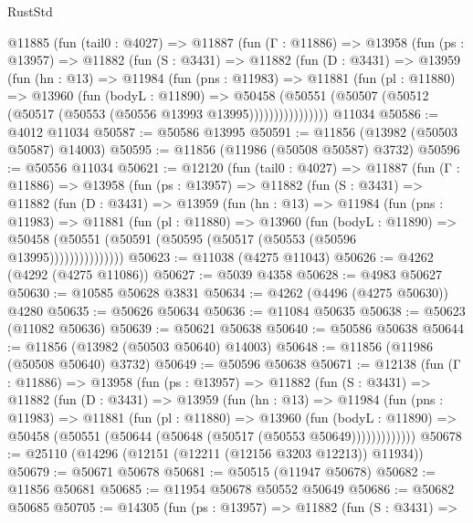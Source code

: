 \begin{lexlean}{RustStd}
\begin{coremodule}
    @11885
      (fun (tail0 : @4027) =>
      @11887
        (fun (Γ : @11886) =>
        @13958
          (fun (ps : @13957) =>
          @11882
            (fun (S : @3431) =>
            @11882
              (fun (D : @3431) =>
              @13959
                (fun (hn : @13) =>
                @11984
                  (fun (pns : @11983) =>
                  @11881
                    (fun (pl : @11880) =>
                    @13960
                      (fun (bodyL : @11890) =>
                      @50458
                        (@50551
                          (@50507 (@50512 (@50517 (@50553 (@50556 @13993 @13995))))))))))))))))
    @11034
@50586 := @4012 @11034
@50587 := @50586 @13995
@50591 := @11856 (@13982 (@50503 @50587) @14003)
@50595 := @11856 (@11986 (@50508 @50587) @3732)
@50596 := @50556 @11034
@50621 := @12120
    (fun (tail0 : @4027) =>
    @11887
      (fun (Γ : @11886) =>
      @13958
        (fun (ps : @13957) =>
        @11882
          (fun (S : @3431) =>
          @11882
            (fun (D : @3431) =>
            @13959
              (fun (hn : @13) =>
              @11984
                (fun (pns : @11983) =>
                @11881
                  (fun (pl : @11880) =>
                  @13960
                    (fun (bodyL : @11890) =>
                    @50458 (@50551 (@50591 (@50595 (@50517 (@50553 (@50596 @13995)))))))))))))))
@50623 := @11038 (@4275 @11043)
@50626 := @4262 (@4292 (@4275 @11086))
@50627 := @5039 @4358
@50628 := @4983 @50627
@50630 := @10585 @50628 @3831
@50634 := @4262 (@4496 (@4275 @50630)) @4280
@50635 := @50626 @50634
@50636 := @11084 @50635
@50638 := @50623 (@11082 @50636)
@50639 := @50621 @50638
@50640 := @50586 @50638
@50644 := @11856 (@13982 (@50503 @50640) @14003)
@50648 := @11856 (@11986 (@50508 @50640) @3732)
@50649 := @50596 @50638
@50671 := @12138
    (fun (Γ : @11886) =>
    @13958
      (fun (ps : @13957) =>
      @11882
        (fun (S : @3431) =>
        @11882
          (fun (D : @3431) =>
          @13959
            (fun (hn : @13) =>
            @11984
              (fun (pns : @11983) =>
              @11881
                (fun (pl : @11880) =>
                @13960
                  (fun (bodyL : @11890) =>
                  @50458 (@50551 (@50644 (@50648 (@50517 (@50553 @50649)))))))))))))
@50678 := @25110 (@14296 (@12151 (@12211 (@12156 @3203 @12213)) @11934))
@50679 := @50671 @50678
@50681 := @50515 (@11947 @50678)
@50682 := @11856 @50681
@50685 := @11954 @50678 @50552 @50649
@50686 := @50682 @50685
@50705 := @14305
    (fun (ps : @13957) =>
    @11882
      (fun (S : @3431) =>

\end{coremodule}
\end{lexlean}
